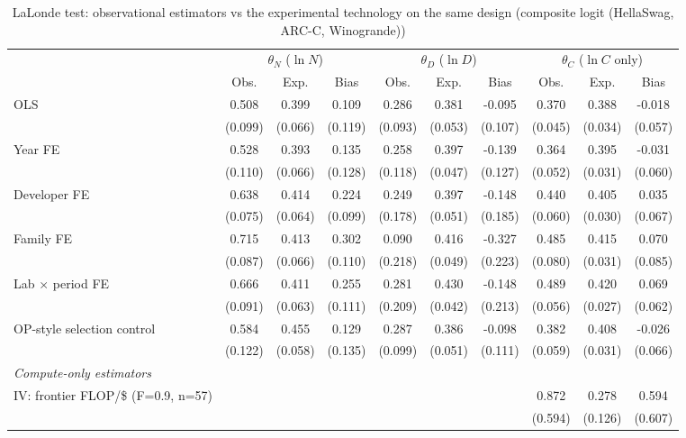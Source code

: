 \begin{table}[!htbp]
\centering
\scriptsize
\begin{threeparttable}
\caption{LaLonde test: observational estimators vs the experimental technology on the same design (composite logit (HellaSwag, ARC-C, Winogrande))}
\label{tab:table6_lalonde_core}
\begin{tabular}{lccccccccc}
\toprule
\multicolumn{1}{c}{} & \multicolumn{3}{c}{$\theta_N$ ($\ln N$)} & \multicolumn{3}{c}{$\theta_D$ ($\ln D$)} & \multicolumn{3}{c}{$\theta_C$ ($\ln C$ only)} \\ \cmidrule(lr){2-4}\cmidrule(lr){5-7}\cmidrule(lr){8-10}
 & Obs. & Exp. & Bias & Obs. & Exp. & Bias & Obs. & Exp. & Bias \\
\midrule
OLS & 0.508 & 0.399 & 0.109 & 0.286 & 0.381 & -0.095 & 0.370 & 0.388 & -0.018 \\
 & (0.099) & (0.066) & (0.119) & (0.093) & (0.053) & (0.107) & (0.045) & (0.034) & (0.057) \\
Year FE & 0.528 & 0.393 & 0.135 & 0.258 & 0.397 & -0.139 & 0.364 & 0.395 & -0.031 \\
 & (0.110) & (0.066) & (0.128) & (0.118) & (0.047) & (0.127) & (0.052) & (0.031) & (0.060) \\
Developer FE & 0.638 & 0.414 & 0.224 & 0.249 & 0.397 & -0.148 & 0.440 & 0.405 & 0.035 \\
 & (0.075) & (0.064) & (0.099) & (0.178) & (0.051) & (0.185) & (0.060) & (0.030) & (0.067) \\
Family FE & 0.715 & 0.413 & 0.302 & 0.090 & 0.416 & -0.327 & 0.485 & 0.415 & 0.070 \\
 & (0.087) & (0.066) & (0.110) & (0.218) & (0.049) & (0.223) & (0.080) & (0.031) & (0.085) \\
Lab $\times$ period FE & 0.666 & 0.411 & 0.255 & 0.281 & 0.430 & -0.148 & 0.489 & 0.420 & 0.069 \\
 & (0.091) & (0.063) & (0.111) & (0.209) & (0.042) & (0.213) & (0.056) & (0.027) & (0.062) \\
OP-style selection control & 0.584 & 0.455 & 0.129 & 0.287 & 0.386 & -0.098 & 0.382 & 0.408 & -0.026 \\
 & (0.122) & (0.058) & (0.135) & (0.099) & (0.051) & (0.111) & (0.059) & (0.031) & (0.066) \\
\midrule
\multicolumn{10}{l}{\textit{Compute-only estimators}} \\
IV: frontier FLOP/\$ (F=0.9, n=57) &  &  &  &  &  &  & 0.872 & 0.278 & 0.594 \\
 &  &  &  &  &  &  & (0.594) & (0.126) & (0.607) \\

\end{tabular}
\end{threeparttable}
\end{table}
